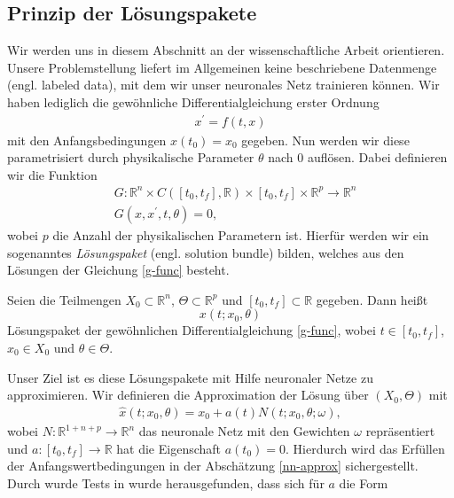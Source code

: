 \subsection{Prinzip der Lösungspakete}
\label{subsec:lsgpakete}
Wir werden uns in diesem Abschnitt an der wissenschaftliche Arbeit \cite{flamantSolvingDifferentialEquations2020}
orientieren. Unsere Problemstellung liefert im Allgemeinen keine beschriebene Datenmenge (engl. labeled data), mit dem
wir unser neuronales Netz trainieren können. Wir haben lediglich die gewöhnliche Differentialgleichung erster Ordnung
\begin{align}
    \label{dgl-machinelearnung}
    x^{\prime} = f(t,x)
\end{align}
mit den Anfangsbedingungen $x(t_0)=x_0$ gegeben. Nun werden wir diese parametrisiert durch physikalische Parameter
$\theta$ nach $0$ auflösen. Dabei definieren wir die Funktion
\begin{align}
    \label{g-func}
    &G:\mathbb{R}^n \times C([t_0,t_f],\mathbb{R}) \times [t_0, t_f] \times \mathbb{R}^p \rightarrow \mathbb{R}^n \nonumber\\
    &G \left( x, x^{\prime}, t, \theta \right) = 0,
\end{align}
wobei $p$ die Anzahl der physikalischen Parametern ist. Hierfür werden wir ein sogenanntes \textit{Lösungspaket}
(engl. solution bundle) bilden, welches aus den Lösungen der Gleichung \eqref{g-func} besteht.
\begin{definition}
    \label{sol-bundle}
    Seien die Teilmengen $X_0 \subset \mathbb{R}^n$, $\Theta \subset \mathbb{R}^p$ und $[t_0,t_f] \subset \mathbb{R}$
    gegeben. Dann heißt
    \[
        x(t;x_0, \theta)
    \]
    Lösungspaket der gewöhnlichen Differentialgleichung \eqref{g-func}, wobei $t \in [t_0,t_f]$, $x_0 \in X_0$ und
    $\theta \in \Theta$.
\end{definition}
Unser Ziel ist es diese Lösungspakete mit Hilfe neuronaler Netze zu approximieren. Wir definieren die Approximation der
Lösung über $(X_0,\Theta)$ mit
\begin{align}
    \label{nn-approx}
    \hat{x}(t;x_0, \theta) = x_0 + a(t) N(t; x_0, \theta; \omega),
\end{align}
wobei $N:\mathbb{R}^{1+n+p} \rightarrow \mathbb{R}^n$ das neuronale Netz mit den Gewichten $\omega$ repräsentiert und
$a:[t_0,t_f] \rightarrow \mathbb{R}$ hat die Eigenschaft $a(t_0)=0$. Hierdurch wird das Erfüllen der
Anfangswertbedingungen in der Abschätzung \eqref{nn-approx} sichergestellt. Durch wurde Tests in
\cite{flamantSolvingDifferentialEquations2020} wurde herausgefunden, dass sich für $a$ die Form
